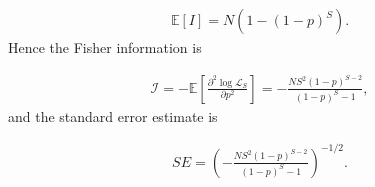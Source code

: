 \documentclass[useAMS,usenatbib,referee]{biom}
\begin{document}
\begin{align}
\mathbb{E}\left[I\right] = N(1-(1-p)^S). \label{eq:exp_intercept}
\end{align} 
Hence the Fisher information is

\begin{align}
\mathcal{I} = -\mathbb{E}\left[\frac{\partial^2 \log\mathcal{L}_S}{\partial p^2}\right]=
 -\frac{NS^2(1-p)^{S-2}}{(1-p)^S-1}, \label{eq:fisher_information}
\end{align}
and the standard error estimate is

\begin{align}
SE = \left(-\frac{NS^2(1-p)^{S-2}}{(1-p)^S-1}\right)^{-1/2}. \label{eq:general_SE_calc}
\end{align}

\end{document}
